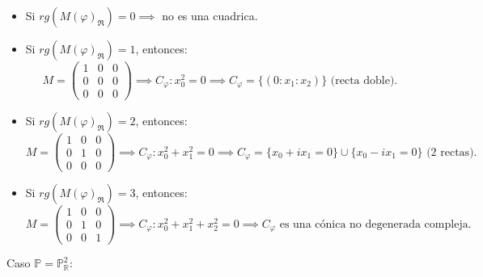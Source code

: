 \begin{itemize}
    \item Si $rg(M(\varphi)_{\mathfrak{R}}) = 0 \implies$ no es una cuadrica.
    \item Si $rg(M(\varphi)_{\mathfrak{R}}) = 1$, entonces:
    \[
        M = \begin{pmatrix}
            1 & 0 & 0 \\
            0 & 0 & 0 \\
            0 & 0 & 0
        \end{pmatrix} \implies C_\varphi : x_0^2 = 0 \implies C_\varphi = \{ (0 : x_1 : x_2) \} \text{ (recta doble).}
    \]
    \item Si $rg(M(\varphi)_{\mathfrak{R}}) = 2$, entonces:
    \[
        M = \begin{pmatrix}
            1 & 0 & 0 \\
            0 & 1 & 0 \\
            0 & 0 & 0
        \end{pmatrix} \implies C_\varphi : x_0^2 + x_1^2 = 0 \implies C_\varphi = \{ x_0 + i x_1 = 0 \} \cup \{ x_0 - i x_1 = 0 \} \text{ (2 rectas).}
    \]
    \item Si $rg(M(\varphi)_{\mathfrak{R}}) = 3$, entonces:
    \[
        M = \begin{pmatrix}
            1 & 0 & 0 \\
            0 & 1 & 0 \\
            0 & 0 & 1
        \end{pmatrix} \implies C_\varphi : x_0^2 + x_1^2 + x_2^2 = 0 \implies C_\varphi \text{ es una cónica no degenerada compleja.}
    \]
\end{itemize}

Caso $\mathbb{P} = \mathbb{P}^2_\mathbb{R}$:

